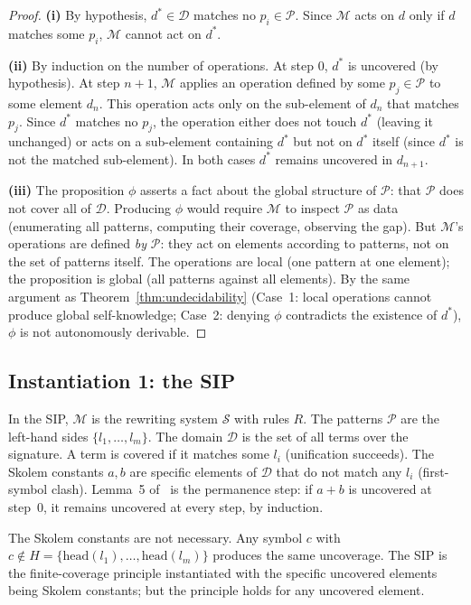 \documentclass[11pt]{article}
\begin{document}
\begin{proof}
\textbf{(i)} By hypothesis, $d^* \in \mathcal{D}$ matches no
$p_i \in \mathcal{P}$. Since $\mathcal{M}$ acts on $d$ only if $d$
matches some $p_i$, $\mathcal{M}$ cannot act on $d^*$.

\textbf{(ii)} By induction on the number of operations. At step $0$,
$d^*$ is uncovered (by hypothesis). At step $n+1$, $\mathcal{M}$ applies
an operation defined by some $p_j \in \mathcal{P}$ to some element $d_n$.
This operation acts only on the sub-element of $d_n$ that matches $p_j$.
Since $d^*$ matches no $p_j$, the operation either does not touch $d^*$
(leaving it unchanged) or acts on a sub-element containing $d^*$ but not
on $d^*$ itself (since $d^*$ is not the matched sub-element). In both
cases $d^*$ remains uncovered in $d_{n+1}$.

\textbf{(iii)} The proposition $\phi$ asserts a fact about the global
structure of $\mathcal{P}$: that $\mathcal{P}$ does not cover all of
$\mathcal{D}$. Producing $\phi$ would require $\mathcal{M}$ to inspect
$\mathcal{P}$ as data (enumerating all patterns, computing their
coverage, observing the gap). But $\mathcal{M}$'s operations are
defined \emph{by} $\mathcal{P}$: they act on elements according to
patterns, not on the set of patterns itself. The operations are local
(one pattern at one element); the proposition is global (all patterns
against all elements). By the same argument as
Theorem~\ref{thm:undecidability} (Case~1: local operations cannot
produce global self-knowledge; Case~2: denying $\phi$ contradicts the
existence of $d^*$), $\phi$ is not autonomously derivable.
\end{proof}

\subsection{Instantiation 1: the SIP~\cite{buono2026sip}}

In the SIP, $\mathcal{M}$ is the rewriting system $\mathcal{S}$ with
rules $R$. The patterns $\mathcal{P}$ are the left-hand sides
$\{l_1, \ldots, l_m\}$. The domain $\mathcal{D}$ is the set of all
terms over the signature. A term is covered if it matches some $l_i$
(unification succeeds). The Skolem constants $a, b$ are specific
elements of $\mathcal{D}$ that do not match any $l_i$ (first-symbol
clash). Lemma~5 of~\cite{buono2026sip} is the permanence step: if $a+b$
is uncovered at step~$0$, it remains uncovered at every step, by
induction.

The Skolem constants are not necessary. Any symbol $c$ with
$c \notin H = \{\mathrm{head}(l_1), \ldots, \mathrm{head}(l_m)\}$
produces the same uncoverage. The SIP is the finite-coverage principle
instantiated with the specific uncovered elements being Skolem
constants; but the principle holds for any uncovered element.
\end{document}
